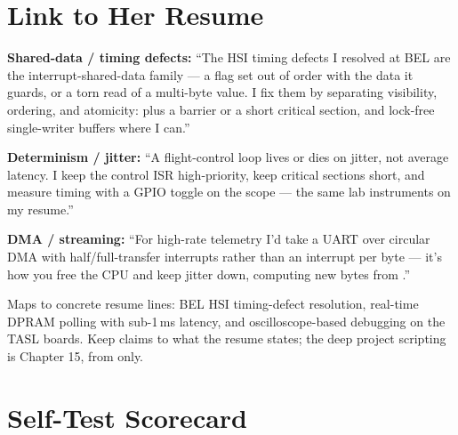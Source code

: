 \section{Link to Her Resume}

\begin{resumelink}
\textbf{Shared-data / timing defects:} ``The HSI timing defects I resolved at
BEL are the interrupt-shared-data family --- a flag set out of order with the
data it guards, or a torn read of a multi-byte value. I fix them by separating
visibility, ordering, and atomicity:  plus a barrier or a short
 critical section, and lock-free single-writer buffers where I
can.''

\medskip
\textbf{Determinism / jitter:} ``A flight-control loop lives or dies on jitter,
not average latency. I keep the control ISR high-priority, keep critical
sections short, and measure timing with a GPIO toggle on the scope --- the same
lab instruments on my resume.''

\medskip
\textbf{DMA / streaming:} ``For high-rate telemetry I'd take a UART over circular
DMA with half/full-transfer interrupts rather than an interrupt per byte ---
it's how you free the CPU and keep jitter down, computing new bytes from
.''

\medskip
\small Maps to concrete resume lines: BEL HSI timing-defect resolution,
real-time DPRAM polling with sub-1\,ms latency, and oscilloscope-based debugging
on the TASL boards. Keep claims to what the resume states; the deep project
scripting is Chapter 15, from  only.
\end{resumelink}

\section{Self-Test Scorecard}


